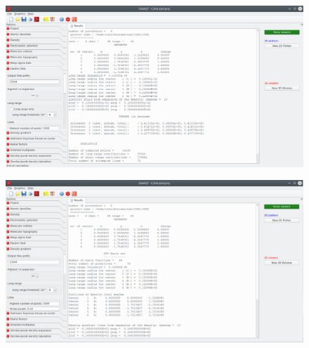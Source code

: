 \documentclass[a4paper,10pt]{article}
\begin{document}
\begin{minipage}{.5\linewidth}
\begin{figure}[H]
\caption{\label{fig:15}}
\begin{center}
\includegraphics[width=0.95\linewidth]{damqt_QS_fig15.png}
\end{center}
\end{figure} 
\end{minipage}
\begin{minipage}{.5\linewidth}
\begin{figure}[H]
\caption{\label{fig:16}}
\begin{center}
\includegraphics[width=0.95\linewidth]{damqt_QS_fig16.png}
\end{center}
\end{figure} 
\end{minipage}
\end{document}
